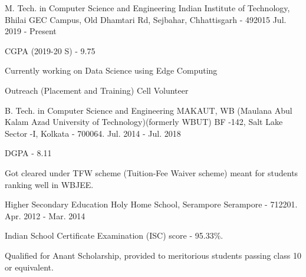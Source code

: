 


\begin{cventries}


\cventry
{M. Tech.  in Computer Science and Engineering} %
{Indian Institute of Technology, Bhilai} %
{GEC Campus, Old Dhamtari Rd, Sejbahar, Chhattisgarh - 492015} %
{Jul. 2019 - Present} %
{ %
\begin{cvitems}
\item {CGPA (2019-20 S) - 9.75}
\item {Currently working on Data Science using Edge Computing}
\item {Outreach (Placement and Training) Cell Volunteer}
\end{cvitems}
}


\cventry
{B. Tech.  in Computer Science and Engineering} %
{MAKAUT, WB (Maulana Abul Kalam Azad University of Technology)\newline (formerly WBUT)} %
{BF -142, Salt Lake Sector -I, \newline
Kolkata - 700064.} %
{Jul. 2014 - Jul. 2018} %
{ %
\begin{cvitems}
\item {DGPA - 8.11}
\item {Got cleared under TFW scheme (Tuition-Fee Waiver scheme) meant for students ranking well in WBJEE.}
\end{cvitems}
}


\cventry
{Higher Secondary Education} %
{Holy Home School, Serampore} %
{Serampore - 712201.} %
{Apr. 2012 - Mar. 2014} %
{ %
\begin{cvitems}
\item {Indian School Certificate Examination (ISC) score - 95.33\%.}
\item {Qualified for Anant Scholarship, provided to meritorious students passing class 10 or equivalent.}
\end{cvitems}
}


\end{cventries}
